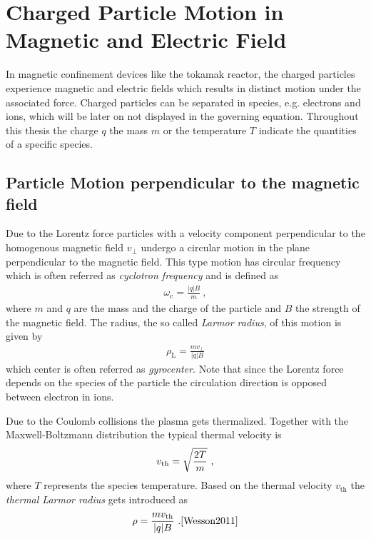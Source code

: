\section{Charged Particle Motion in Magnetic and Electric Field}
\label{sec:motion}

In magnetic confinement devices like the tokamak reactor, the charged particles experience magnetic and electric fields which results in distinct motion under the associated force. Charged particles can be separated in species, e.g. electrons and ions, which will be later on not displayed in the governing equation. Throughout this thesis the charge $q$ the mass $m$ or the temperature $T$ indicate the quantities of a specific species.

\subsection{Particle Motion perpendicular to the magnetic field}
\label{sub:gyromotion}

Due to the Lorentz force particles with a velocity component perpendicular to the homogenous magnetic field $v_{\perp}$ undergo a circular motion in the plane perpendicular to the magnetic field. This type motion has circular frequency which is often referred as \textit{cyclotron frequency} and is defined as
\begin{gather}
    \omega_\mathrm{c} = \frac{|q|B}{m}~,
\end{gather}
where $m$ and $q$ are the mass and the charge of the particle and $B$ the strength of the magnetic field. The radius, the so called \textit{Larmor radius}, of this motion is given by
\begin{gather}
    \rho_\mathrm{L} = \frac{mv_{\perp}}{|q|B}
\end{gather}
which center is often referred as \textit{gyrocenter}. Note that since the Lorentz force depends on the species of the particle the circulation direction is opposed between electron in ions.\\\bigskip

Due to the Coulomb collisions the plasma gets thermalized. Together with the Maxwell-Boltzmann distribution the typical thermal velocity is
\begin{gather}
    v_{\mathrm{th}} = \sqrt{\frac{2T}{m}}~,
\end{gather}
where $T$ represents the species temperature. Based on the thermal velocity $v_\mathrm{th}$ the \textit{thermal Larmor radius} gets introduced as
\begin{gather}
    \rho = \frac{mv_{\mathrm{th}}}{|q|B}~. \cite{Wesson2011}
\end{gather}

